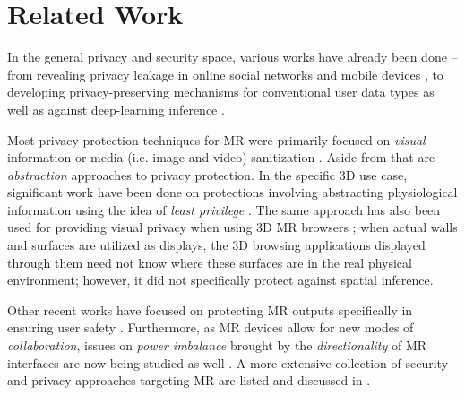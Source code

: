 

\section{Related Work}\label{sec:related-work}

In the general privacy and security space, various works have already been done -- from revealing privacy leakage in online social networks \cite{krishnamurthy2010privacy} and mobile devices \cite{ren2016recon}, to developing privacy-preserving mechanisms for conventional user data types \cite{sweeney2002k, mcsherry2007mechanism, dwork2014algorithmic} as well as against deep-learning inference \cite{shokri2015privacy, abadi2016deep}. %

Most privacy protection techniques for MR were primarily focused on \textit{visual} information or media (i.e. image and video) sanitization \cite{jana2013scanner,raval2014markit, roesner2014world, aditya2016pic, raval2016you, shu2016cardea, li2016privacycamera}. Aside from that are \textit{abstraction} approaches to privacy protection. In the specific 3D use case, significant work have been done on protections involving abstracting physiological information \cite{jana2013scanner, figueiredo2016prepose} using the idea of \textit{least privilege} \cite{vilk2014least}. The same approach has also been used for providing visual privacy when using 3D MR browsers \cite{vilk2015surroundweb};  when actual walls and surfaces are utilized as displays, the 3D browsing applications displayed through them need not know where these surfaces are in the real physical environment; however, it did not specifically protect against spatial inference.

Other recent works have focused on protecting MR outputs specifically in ensuring user safety \cite{lebeck2016safely, lebeck2017securing}. Furthermore, as MR devices allow for new modes of \textit{collaboration}, issues on \textit{power imbalance} brought by the \textit{directionality} of MR interfaces \cite{benford1996shared, benford1998boundaries} are now being studied as well \cite{lebeck2018towards}. A more extensive collection of security and privacy approaches targeting MR are listed and discussed in \cite{deguzman2018security}.


